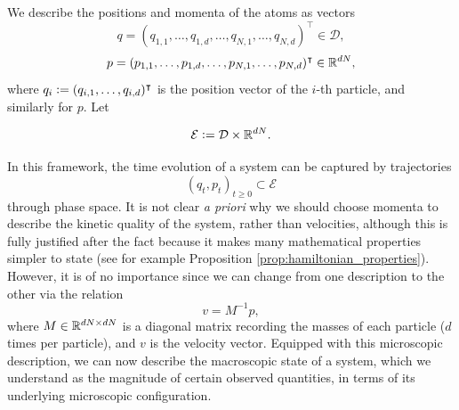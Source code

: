 \begin{definition}

    We describe the positions and momenta of the atoms as vectors
    $$ q=(q_{1,1},\dots,q_{1,d},\dots ,q_{N,1},\dots,q_{N,d})^\intercal \in \mathcal D,$$
    $$ p=(p_{1,1},\dots,p_{1,d},\dots ,p_{N,1},\dots,p_{N,d})^\intercal \in \mathbb{R}^{dN},$$
    where $q_i \mathrel{\mathop:}= (q_{i,1},\dots, q_{i,d})^\intercal$ is the position vector of the $i$-th particle, and similarly for $p$. Let

    $$\mathcal E \mathrel{\mathop:}= \mathcal D \times \mathbb{R}^{dN}.$$
\end{definition}

In this framework, the time evolution of a system can be captured by trajectories
$$(q_t,p_t)_{t\geq 0} \subset \mathcal E$$
through phase space.
It is not clear \textit{a priori} why we should choose momenta to describe the kinetic quality of the system, rather than velocities, although this is fully justified after the fact because it makes many mathematical properties simpler to state (see for example Proposition \ref{prop:hamiltonian_properties}). However, it is of no importance since we can change from one description to the other via the relation
$$v=M^{-1}p,$$
where $M\in \mathbb{R}^{dN \times dN}$ is a diagonal matrix recording the masses of each particle ($d$ times per particle), and $v$ is the velocity vector.
Equipped with this microscopic description, we can now describe the macroscopic state of a system, which we understand as the magnitude of certain observed quantities,
in terms of its underlying microscopic configuration.

